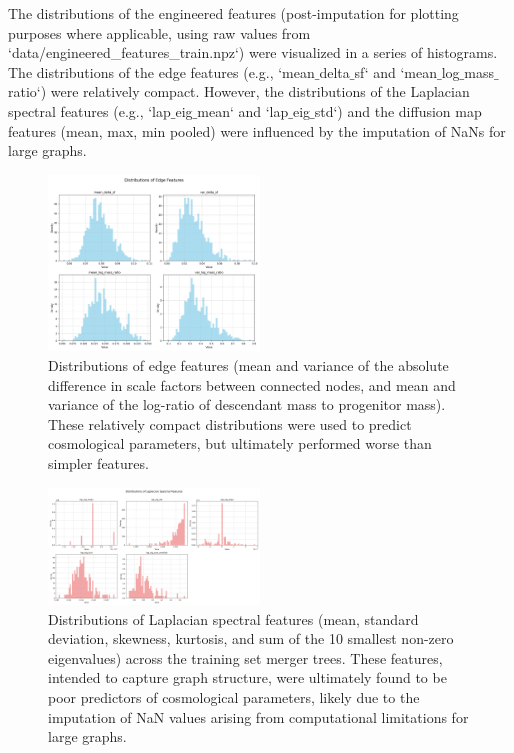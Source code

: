 \documentclass[twocolumn]{aastex631}
\begin{document}
The distributions of the engineered features (post-imputation for plotting purposes where applicable, using raw values from `data/engineered_features_train.npz`) were visualized in a series of histograms. The distributions of the edge features (e.g., `mean\ensuremath{\_}delta\ensuremath{\_}sf` and `mean\ensuremath{\_}log\ensuremath{\_}mass\ensuremath{\_}ratio`) were relatively compact. However, the distributions of the Laplacian spectral features (e.g., `lap\ensuremath{\_}eig\ensuremath{\_}mean` and `lap\ensuremath{\_}eig\ensuremath{\_}std`) and the diffusion map features (mean, max, min pooled) were influenced by the imputation of NaNs for large graphs.

\begin{figure}[h!]
    \centering
    \includegraphics[width=0.5\textwidth]{../input_files/plots/engineered_feature_dist_edge_1_20250527-135752.png}
    \caption{Distributions of edge features (mean and variance of the absolute difference in scale factors between connected nodes, and mean and variance of the log-ratio of descendant mass to progenitor mass). These relatively compact distributions were used to predict cosmological parameters, but ultimately performed worse than simpler features.}
    \label{fig:edge_feature_dist}
\end{figure}

\begin{figure}[h!]
    \centering
    \includegraphics[width=0.5\textwidth]{../input_files/plots/engineered_feature_dist_laplacian_2_20250527-135752.png}
    \caption{Distributions of Laplacian spectral features (mean, standard deviation, skewness, kurtosis, and sum of the 10 smallest non-zero eigenvalues) across the training set merger trees. These features, intended to capture graph structure, were ultimately found to be poor predictors of cosmological parameters, likely due to the imputation of NaN values arising from computational limitations for large graphs.}
    \label{fig:laplacian_feature_dist}
\end{figure}
\end{document}
